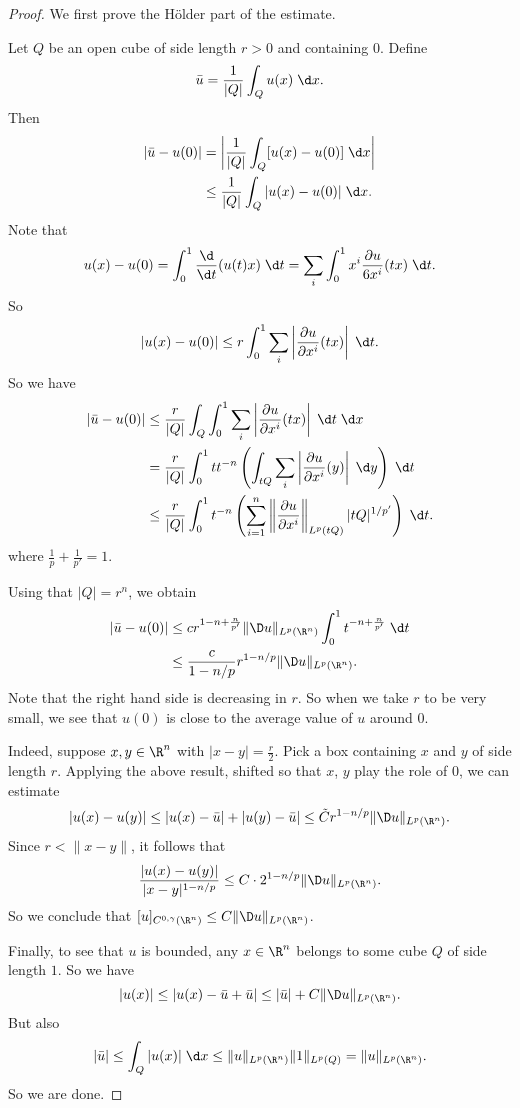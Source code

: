 \documentclass[a4paper]{article}
\begin{document}
\begin{proof}
  We first prove the H\"older part of the estimate.

  Let $Q$ be an open cube of side length $r > 0$ and containing $0$. Define
  \[
    \bar{u} = \frac{1}{|Q|} \int_Q u(x)\;\d x.
  \]
  Then
  \begin{align*}
    |\bar{u} - u(0)| &= \left|\frac{1}{|Q|} \int_Q [u(x) - u(0)]\;\d x\right|\\
    &\leq \frac{1}{|Q|} \int_Q |u(x) - u(0)|\;\d x.
  \end{align*}
  Note that
  \[
    u(x) - u(0) = \int_0^1 \frac{\d}{\d t} (u(t)x)\;\d t = \sum_i \int_0^1 x^i \frac{\partial u}{6 x^i} (tx)\;\d t.
  \]
  So
  \[
    |u(x) - u(0)| \leq r \int_0^1 \sum_i \left|\frac{\partial u}{\partial x^i} (tx)\right|\;\d t.
  \]
  So we have
  \begin{align*}
    |\bar{u} - u(0)| &\leq \frac{r}{|Q|} \int_Q \int_0^1 \sum_i \left|\frac{\partial u}{\partial x^i}(tx)\right|\;\d t\;\d x\\
    &= \frac{r}{|Q|} \int_0^1 tt^{-n} \left(\int_{tQ} \sum_i \left|\frac{\partial u}{\partial x^i} (y)\right|\;\d y \right)\;\d t\\
    &\leq \frac{r}{|Q|} \int_0^1 t^{-n} \left(\sum_{i = 1}^n \left\|\frac{\partial u}{\partial x^i}\right\|_{L^p(tQ)} |tQ|^{1/p'}\right)\;\d t.
  \end{align*}
  where $\frac{1}{p} + \frac{1}{p'} = 1$.

  Using that $|Q| = r^n$, we obtain
  \begin{align*}
    |\bar{u} - u(0)| &\leq c r^{1 -n + \frac{n}{p'}} \|\D u\|_{L^p(\R^n)} \int_0^1 t^{-n + \frac{n}{p'}} \;\d t\\
    &\leq \frac{c}{1 - n/p} r^{1 - n/p} \|\D u\|_{L^p(\R^n)}.
  \end{align*}
  Note that the right hand side is decreasing in $r$. So when we take $r$ to be very small, we see that $u(0)$ is close to the average value of $u$ around $0$.

  Indeed, suppose $x, y \in \R^n$ with $|x - y| = \frac{r}{2}$. Pick a box containing $x$ and $y$ of side length $r$. Applying the above result, shifted so that $x$, $y$ play the role of $0$, we can estimate
  \[
    |u(x) - u(y)| \leq |u(x) - \bar{u}| + |u(y) - \bar{u}| \leq \tilde{C} r^{1 - n/p} \|\D u\|_{L^p(\R^n)}.
  \]
  Since $r < \|x - y\|$, it follows that
  \[
    \frac{|u(x) - u(y)|}{|x - y|^{1 - n/p}} \leq C \cdot 2^{1 - n/p} \|\D u\|_{L^p(\R^n)}.
  \]
  So we conclude that $[u]_{C^{0, \gamma}(\R^n)} \leq C \|\D u\|_{L^p(\R^n)}$.

  Finally, to see that $u$ is bounded, any $x \in \R^n$ belongs to some cube $Q$ of side length $1$. So we have
  \[
    |u(x)| \leq |u(x) - \bar{u} + \bar{u}| \leq |\bar{u}| + C \|\D u\|_{L^p(\R^n)}.
  \]
  But also
  \[
    |\bar{u}| \leq \int_Q |u(x)|\;\d x \leq \|u\|_{L^p(\R^n)} \|1\|_{L^p(Q)} = \|u\|_{L^p(\R^n)}.
  \]
  So we are done.
\end{proof}
\end{document}
